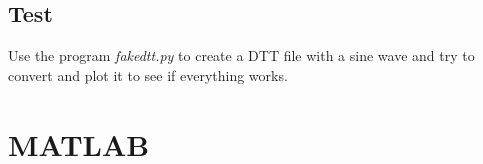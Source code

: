 \documentclass[a4paper]{article}
\begin{document}
\begin{multicols}{2}
    \subsection{Test}
    Use the program \textit{fakedtt.py} to create a DTT file with a sine
    wave and try to convert and plot it to see if everything works.

  \section{MATLAB}


\end{multicols}
\end{document}
